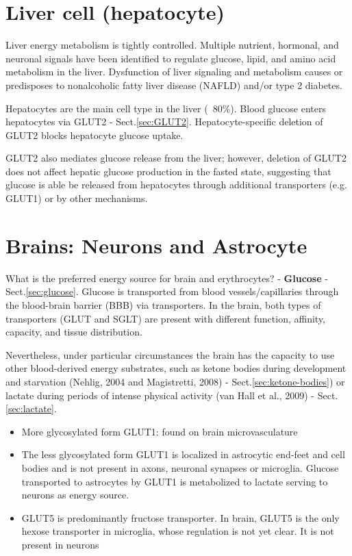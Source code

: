 \section{Liver cell (hepatocyte)}
\label{sec:hepatocyte}

Liver energy metabolism is tightly controlled. Multiple nutrient, hormonal, and
neuronal signals have been identified to regulate glucose, lipid, and amino acid
metabolism in the liver. Dysfunction of liver signaling and metabolism causes or
predisposes to nonalcoholic fatty liver disease (NAFLD) and/or type 2 diabetes.

Hepatocytes are the main cell type in the liver (~80\%). Blood glucose enters
hepatocytes via GLUT2 - Sect.\ref{sec:GLUT2}. Hepatocyte-specific deletion of
GLUT2 blocks hepatocyte glucose uptake.

GLUT2 also mediates glucose release from the liver; however, deletion of GLUT2
does not affect hepatic glucose production in the fasted state,  suggesting that
glucose is able be released from hepatocytes through additional transporters
(e.g. GLUT1) or by other mechanisms.


\section{Brains: Neurons and Astrocyte}
\label{sec:brain-energy-substrate}

What is the preferred energy source for brain and erythrocytes? - {\bf Glucose}
- Sect.\ref{sec:glucose}.  Glucose is transported from blood vessels/capillaries
through the blood-brain barrier (BBB) via transporters. In the brain, both types
of transporters (GLUT and SGLT) are present with different function, affinity,
capacity, and tissue distribution.

Nevertheless, under particular circumstances the brain has the capacity to use
other blood-derived energy substrates, such as ketone bodies during development
and starvation (Nehlig, 2004 and Magistretti, 2008) -
Sect.\ref{sec:ketone-bodies}) or lactate during periods of intense physical
activity (van Hall et al., 2009) - Sect.\ref{sec:lactate}.


\begin{itemize}
  \item More glycosylated form GLUT1: found on brain microvasculature
  
  \item The less glycosylated form GLUT1 is localized in astrocytic end-feet and
  cell bodies and is not present in axons, neuronal synapses or microglia. Glucose
  transported to astrocytes by GLUT1 is metabolized to lactate serving to
  neurons as energy source.   
  
  \item GLUT5 is predominantly fructose transporter. In brain, GLUT5 is the only
  hexose transporter in microglia, whose regulation is not yet clear. It is not
  present in neurons 
\end{itemize}
 
